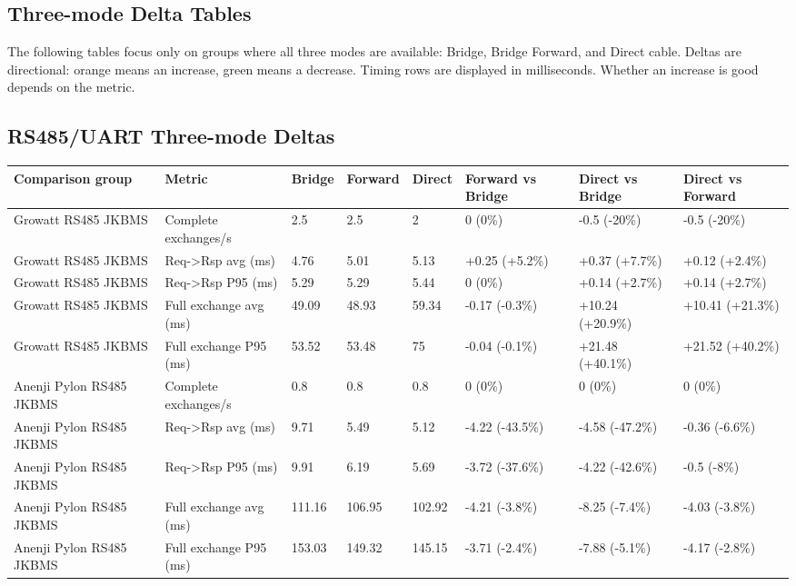 \documentclass[11pt,a4paper]{article}
\newcommand{\increase}[1]{\textcolor{increasecolor}{#1}}
\newcommand{\decrease}[1]{\textcolor{decreasecolor}{#1}}
\begin{document}
\begin{landscape}

\section{Three-mode Delta Tables}

The following tables focus only on groups where all three modes are available: Bridge, Bridge Forward, and Direct cable. Deltas are directional: orange means an increase, green means a decrease. Timing rows are displayed in milliseconds. Whether an increase is good depends on the metric.

\subsection{RS485/UART Three-mode Deltas}
\begingroup
\scriptsize
\setlength{\tabcolsep}{3pt}
\setlength{\LTpre}{0.35em}
\setlength{\LTpost}{0.45em}
\begin{longtable}{@{}L{5.0cm}L{4.0cm}L{1.65cm}L{1.65cm}L{1.65cm}L{2.8cm}L{2.8cm}L{2.8cm}@{}}
\toprule
Comparison group & Metric & Bridge & Forward & Direct & Forward vs Bridge & Direct vs Bridge & Direct vs Forward \\
\midrule
\endhead
Growatt RS485 JKBMS & Complete exchanges/s & 2.5 & 2.5 & 2 & 0 (0\%) & \decrease{-0.5 (-20\%)} & \decrease{-0.5 (-20\%)} \\
Growatt RS485 JKBMS & Req->Rsp avg (ms) & 4.76 & 5.01 & 5.13 & \increase{+0.25 (+5.2\%)} & \increase{+0.37 (+7.7\%)} & \increase{+0.12 (+2.4\%)} \\
Growatt RS485 JKBMS & Req->Rsp P95 (ms) & 5.29 & 5.29 & 5.44 & 0 (0\%) & \increase{+0.14 (+2.7\%)} & \increase{+0.14 (+2.7\%)} \\
Growatt RS485 JKBMS & Full exchange avg (ms) & 49.09 & 48.93 & 59.34 & \decrease{-0.17 (-0.3\%)} & \increase{+10.24 (+20.9\%)} & \increase{+10.41 (+21.3\%)} \\
Growatt RS485 JKBMS & Full exchange P95 (ms) & 53.52 & 53.48 & 75 & \decrease{-0.04 (-0.1\%)} & \increase{+21.48 (+40.1\%)} & \increase{+21.52 (+40.2\%)} \\
Anenji Pylon RS485 JKBMS & Complete exchanges/s & 0.8 & 0.8 & 0.8 & 0 (0\%) & 0 (0\%) & 0 (0\%) \\
Anenji Pylon RS485 JKBMS & Req->Rsp avg (ms) & 9.71 & 5.49 & 5.12 & \decrease{-4.22 (-43.5\%)} & \decrease{-4.58 (-47.2\%)} & \decrease{-0.36 (-6.6\%)} \\
Anenji Pylon RS485 JKBMS & Req->Rsp P95 (ms) & 9.91 & 6.19 & 5.69 & \decrease{-3.72 (-37.6\%)} & \decrease{-4.22 (-42.6\%)} & \decrease{-0.5 (-8\%)} \\
Anenji Pylon RS485 JKBMS & Full exchange avg (ms) & 111.16 & 106.95 & 102.92 & \decrease{-4.21 (-3.8\%)} & \decrease{-8.25 (-7.4\%)} & \decrease{-4.03 (-3.8\%)} \\
Anenji Pylon RS485 JKBMS & Full exchange P95 (ms) & 153.03 & 149.32 & 145.15 & \decrease{-3.71 (-2.4\%)} & \decrease{-7.88 (-5.1\%)} & \decrease{-4.17 (-2.8\%)} \\
\bottomrule
\end{longtable}
\endgroup






\end{landscape}
\end{document}
